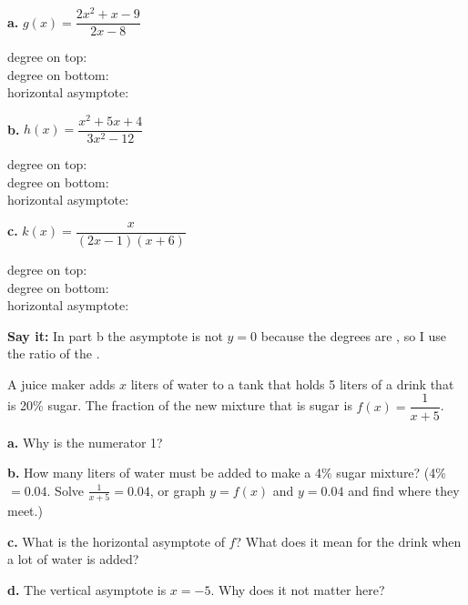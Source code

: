 \begin{minipage}[t]{0.32\textwidth}
\textbf{a.} $g(x)=\dfrac{2x^2+x-9}{2x-8}$

\vspace{4pt}
degree on top: \blank[1cm]\\[4pt]
degree on bottom: \blank[1cm]\\[4pt]
horizontal asymptote:\\[4pt] \blank[3.5cm]
\end{minipage}\hfill
\begin{minipage}[t]{0.32\textwidth}
\textbf{b.} $h(x)=\dfrac{x^2+5x+4}{3x^2-12}$

\vspace{4pt}
degree on top: \blank[1cm]\\[4pt]
degree on bottom: \blank[1cm]\\[4pt]
horizontal asymptote:\\[4pt] \blank[3.5cm]
\end{minipage}\hfill
\begin{minipage}[t]{0.32\textwidth}
\textbf{c.} $k(x)=\dfrac{x}{(2x-1)(x+6)}$

\vspace{4pt}
degree on top: \blank[1cm]\\[4pt]
degree on bottom: \blank[1cm]\\[4pt]
horizontal asymptote:\\[4pt] \blank[3.5cm]
\end{minipage}

\textbf{Say it:} In part b the asymptote is not $y=0$ because the degrees are \blank[2cm], so I use the ratio of the \blank[3.5cm].

A juice maker adds $x$ liters of water to a tank that holds 5 liters of a drink that is 20\% sugar. The fraction of the new mixture that is sugar is $f(x)=\dfrac{1}{x+5}$.

\begin{minipage}[t]{0.48\textwidth}
\textbf{a.} Why is the numerator 1?\lines[2]

\textbf{b.} How many liters of water must be added to make a 4\% sugar mixture? (4\% $=0.04$. Solve $\frac{1}{x+5}=0.04$, or graph $y=f(x)$ and $y=0.04$ and find where they meet.)\lines[3]
\end{minipage}\hfill
\begin{minipage}[t]{0.48\textwidth}
\textbf{c.} What is the horizontal asymptote of $f$? What does it mean for the drink when a lot of water is added?\lines[3]

\textbf{d.} The vertical asymptote is $x=-5$. Why does it not matter here?\lines[2]
\end{minipage}

